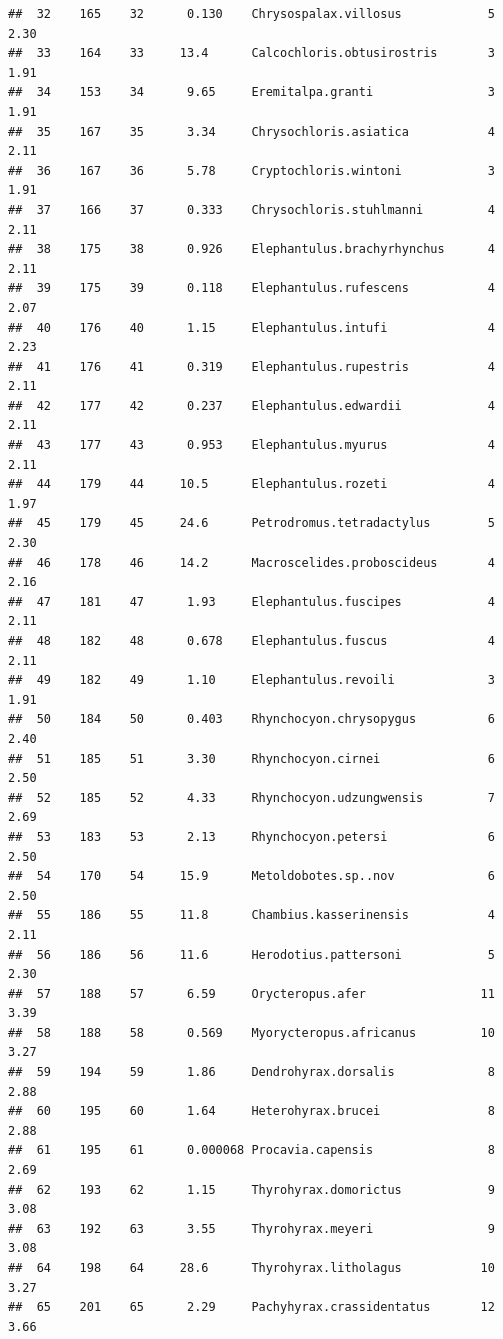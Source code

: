 \documentclass[10pt,letterpaper]{article}
\begin{document}
\begin{verbatim}
##  32    165    32      0.130    Chrysospalax.villosus            5    2.30 
##  33    164    33     13.4      Calcochloris.obtusirostris       3    1.91 
##  34    153    34      9.65     Eremitalpa.granti                3    1.91 
##  35    167    35      3.34     Chrysochloris.asiatica           4    2.11 
##  36    167    36      5.78     Cryptochloris.wintoni            3    1.91 
##  37    166    37      0.333    Chrysochloris.stuhlmanni         4    2.11 
##  38    175    38      0.926    Elephantulus.brachyrhynchus      4    2.11 
##  39    175    39      0.118    Elephantulus.rufescens           4    2.07 
##  40    176    40      1.15     Elephantulus.intufi              4    2.23 
##  41    176    41      0.319    Elephantulus.rupestris           4    2.11 
##  42    177    42      0.237    Elephantulus.edwardii            4    2.11 
##  43    177    43      0.953    Elephantulus.myurus              4    2.11 
##  44    179    44     10.5      Elephantulus.rozeti              4    1.97 
##  45    179    45     24.6      Petrodromus.tetradactylus        5    2.30 
##  46    178    46     14.2      Macroscelides.proboscideus       4    2.16 
##  47    181    47      1.93     Elephantulus.fuscipes            4    2.11 
##  48    182    48      0.678    Elephantulus.fuscus              4    2.11 
##  49    182    49      1.10     Elephantulus.revoili             3    1.91 
##  50    184    50      0.403    Rhynchocyon.chrysopygus          6    2.40 
##  51    185    51      3.30     Rhynchocyon.cirnei               6    2.50 
##  52    185    52      4.33     Rhynchocyon.udzungwensis         7    2.69 
##  53    183    53      2.13     Rhynchocyon.petersi              6    2.50 
##  54    170    54     15.9      Metoldobotes.sp..nov             6    2.50 
##  55    186    55     11.8      Chambius.kasserinensis           4    2.11 
##  56    186    56     11.6      Herodotius.pattersoni            5    2.30 
##  57    188    57      6.59     Orycteropus.afer                11    3.39 
##  58    188    58      0.569    Myorycteropus.africanus         10    3.27 
##  59    194    59      1.86     Dendrohyrax.dorsalis             8    2.88 
##  60    195    60      1.64     Heterohyrax.brucei               8    2.88 
##  61    195    61      0.000068 Procavia.capensis                8    2.69 
##  62    193    62      1.15     Thyrohyrax.domorictus            9    3.08 
##  63    192    63      3.55     Thyrohyrax.meyeri                9    3.08 
##  64    198    64     28.6      Thyrohyrax.litholagus           10    3.27 
##  65    201    65      2.29     Pachyhyrax.crassidentatus       12    3.66 

\end{verbatim}
\end{document}
